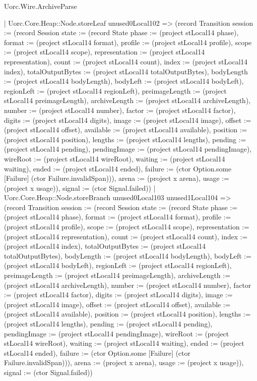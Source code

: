 \begin{lexlean}{Uorc.Wire.ArchiveParse}
\begin{semanticmodule}
{            | Uorc.Core.Heap::Node.storeLeaf unused0Local102 => (record Transition {session := (record Session {state := (record State {phase := (project stLocal14 phase), format := (project stLocal14 format), profile := (project stLocal14 profile), scope := (project stLocal14 scope), representation := (project stLocal14 representation), count := (project stLocal14 count), index := (project stLocal14 index), totalOutputBytes := (project stLocal14 totalOutputBytes), bodyLength := (project stLocal14 bodyLength), bodyLeft := (project stLocal14 bodyLeft), regionLeft := (project stLocal14 regionLeft), preimageLength := (project stLocal14 preimageLength), archiveLength := (project stLocal14 archiveLength), number := (project stLocal14 number), factor := (project stLocal14 factor), digits := (project stLocal14 digits), image := (project stLocal14 image), offset := (project stLocal14 offset), available := (project stLocal14 available), position := (project stLocal14 position), lengths := (project stLocal14 lengths), pending := (project stLocal14 pending), pendingImage := (project stLocal14 pendingImage), wireRoot := (project stLocal14 wireRoot), waiting := (project stLocal14 waiting), ended := (project stLocal14 ended), failure := (ctor Option.some [Failure] (ctor Failure.invalidSpan))}), arena := (project x arena), usage := (project x usage)}), signal := (ctor Signal.failed)})
            | Uorc.Core.Heap::Node.storeBranch unused0Local103 unused1Local104 => (record Transition {session := (record Session {state := (record State {phase := (project stLocal14 phase), format := (project stLocal14 format), profile := (project stLocal14 profile), scope := (project stLocal14 scope), representation := (project stLocal14 representation), count := (project stLocal14 count), index := (project stLocal14 index), totalOutputBytes := (project stLocal14 totalOutputBytes), bodyLength := (project stLocal14 bodyLength), bodyLeft := (project stLocal14 bodyLeft), regionLeft := (project stLocal14 regionLeft), preimageLength := (project stLocal14 preimageLength), archiveLength := (project stLocal14 archiveLength), number := (project stLocal14 number), factor := (project stLocal14 factor), digits := (project stLocal14 digits), image := (project stLocal14 image), offset := (project stLocal14 offset), available := (project stLocal14 available), position := (project stLocal14 position), lengths := (project stLocal14 lengths), pending := (project stLocal14 pending), pendingImage := (project stLocal14 pendingImage), wireRoot := (project stLocal14 wireRoot), waiting := (project stLocal14 waiting), ended := (project stLocal14 ended), failure := (ctor Option.some [Failure] (ctor Failure.invalidSpan))}), arena := (project x arena), usage := (project x usage)}), signal := (ctor Signal.failed)})
}
\end{semanticmodule}
\end{lexlean}
